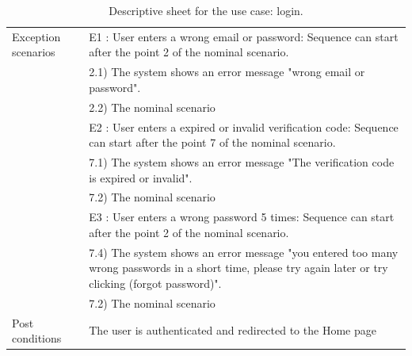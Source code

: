 \documentclass[]{uc2pfecaneva}
\begin{document}
\begin{table}[h]
\begin{tabularx}{\textwidth}{|l|X|}
		Exception scenarios
		                      & E1 : User enters a wrong email or password: Sequence can start after the point 2 of the nominal scenario.                                                            \\
		                      & \hspace{4mm}2.1) The system shows an error message "wrong email or password".                                                                                        \\
		                      & \hspace{4mm}2.2) The nominal scenario                                                                                                                                \\
		                      & E2 : User enters a expired or invalid verification code: Sequence can start after the point 7 of the nominal scenario.                                               \\
		                      & \hspace{4mm}7.1) The system shows an error message "The verification code is expired or invalid".                                                                    \\
		                      & \hspace{4mm}7.2) The nominal scenario                                                                                                                                \\
		                      & E3 : User enters a wrong password 5 times: Sequence can start after the point 2 of the nominal scenario.                                                             \\
		                      & \hspace{4mm}7.4) The system shows an error message "you entered too many wrong passwords in a short time, please try again later or try clicking (forgot password)". \\
		                      & \hspace{4mm}7.2) The nominal scenario                                                                                                                                \\ \hline
		Post conditions
		                      & The user is authenticated and redirected to the Home page                                                                                                            \\ \hline
	\end{tabularx}
	\caption{Descriptive sheet for the use case: login.}
	\label{table:1}
\end{table}
\clearpage
\end{document}
